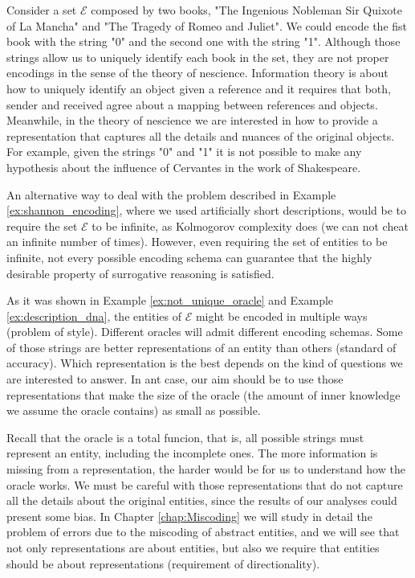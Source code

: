 \begin{example}
\label{ex:shannon_encoding}
Consider a set $\mathcal{E}$ composed by two books, "The Ingenious Nobleman Sir Quixote of La Mancha" and "The Tragedy of Romeo and Juliet". We could encode the fist book with the string "0" and the second one with the string "1". Although those strings allow us to uniquely identify each book in the set, they are not proper encodings in the sense of the theory of nescience. Information theory is about how to uniquely identify an object given a reference and it requires that both, sender and received agree about a mapping between references and objects. Meanwhile, in the theory of nescience we are interested in how to provide a representation that captures all the details and nuances of the original objects. For example, given the strings "0" and "1" it is not possible to make any hypothesis about the influence of Cervantes in the work of Shakespeare.
\end{example}

An alternative way to deal with the problem described in Example \ref{ex:shannon_encoding}, where we used artificially short descriptions, would be to require the set $\mathcal{E}$ to be infinite, as Kolmogorov complexity does (we can not cheat an infinite number of times). However, even requiring the set of entities to be infinite, not every possible encoding schema can guarantee that the highly desirable property of surrogative reasoning is satisfied.

As it was shown in Example \ref{ex:not_unique_oracle} and Example \ref{ex:description_dna}, the entities of $\mathcal{E}$ might be encoded in multiple ways (problem of style). Different oracles will admit different encoding schemas. Some of those strings are better representations of an entity than others (standard of accuracy). Which representation is the best depends on the kind of questions we are interested to answer. In ant case, our aim should be to use those representations that make the size of the oracle (the amount of inner knowledge we assume the oracle contains) as small as possible.

Recall that the oracle is a total funcion, that is, all possible strings must represent an entity, including the incomplete ones. The more information is missing from a representation, the harder would be for us to understand how the oracle works. We must be careful with those representations that do not capture all the details about the original entities, since the results of our analyses could present some bias. In Chapter \ref{chap:Miscoding} we will study in detail the problem of errors due to the miscoding of abstract entities, and we will see that not only representations are about entities, but also we require that entities should be about representations (requirement of directionality).

